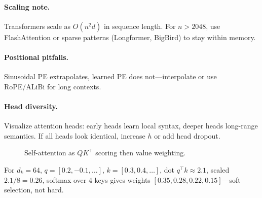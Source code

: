 \paragraph{Scaling note.} Transformers scale as $O(n^2 d)$ in sequence length. For $n>2048$, use FlashAttention or sparse patterns (Longformer, BigBird) to stay within memory.
\paragraph{Positional pitfalls.} Sinusoidal PE extrapolates, learned PE does not—interpolate or use RoPE/ALiBi for long contexts.
\paragraph{Head diversity.} Visualize attention heads: early heads learn local syntax, deeper heads long-range semantics. If all heads look identical, increase $h$ or add head dropout.

\begin{figure}[h]\centering
{}
\caption{Self-attention as $QK^\top$ scoring then value weighting.}
\end{figure}
\begin{example} For $d_k=64$, $q=[0.2, -0.1,\dots]$, $k=[0.3,0.4,\dots]$, dot $q^\top k\approx 2.1$, scaled $2.1/8=0.26$, softmax over 4 keys gives weights $[0.35,0.28,0.22,0.15]$—soft selection, not hard.
\end{example}

